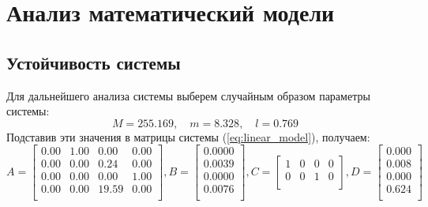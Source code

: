 \section{Анализ математический модели}
\subsection{Устойчивость системы} 
Для дальнейшего анализа системы выберем случайным образом параметры системы:
\begin{equation}
    M = 255.169,\quad m = 8.328,\quad l = 0.769
\end{equation}
Подставив эти значения в матрицы системы (\ref{eq:linear_model}), получаем: 
\begin{equation}
    A = \begin{bmatrix}
        0.00  & 1.00  & 0.00  & 0.00 \\ 
        0.00  & 0.00  & 0.24  & 0.00 \\ 
        0.00  & 0.00  & 0.00  & 1.00 \\ 
        0.00  & 0.00  & 19.59  & 0.00 \\ 
    \end{bmatrix},
    B = \begin{bmatrix}
        0.0000 \\ 
        0.0039 \\ 
        0.0000 \\ 
        0.0076 \\ 
    \end{bmatrix},
    C = \begin{bmatrix}
        1  & 0  & 0  & 0 \\ 
        0  & 0  & 1  & 0 \\ 
    \end{bmatrix},
    D = \begin{bmatrix}
        0.000 \\ 
        0.008 \\ 
        0.000 \\ 
        0.624 \\ 
    \end{bmatrix}
\end{equation}


